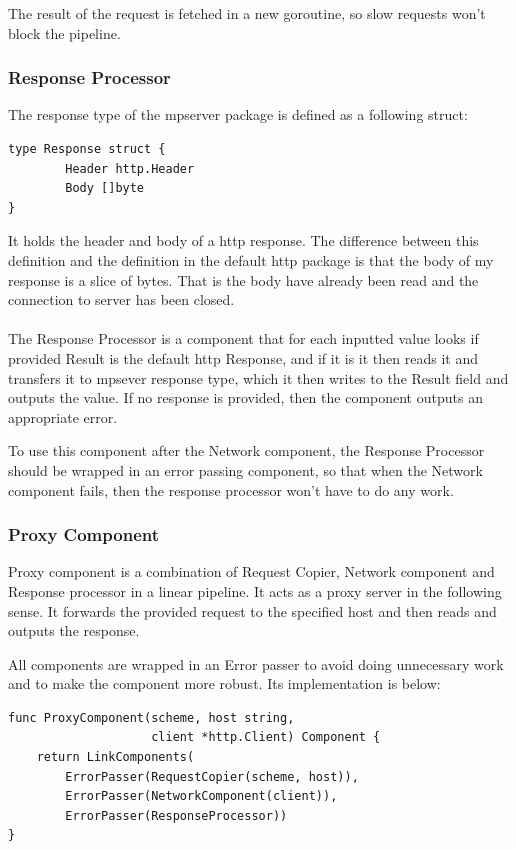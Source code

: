 \documentclass[12pt,a4paper]{article}
\begin{document}
The result of the request is fetched in a new goroutine, so slow requests
won't block the pipeline.

\subsubsection{Response Processor}
The response type of the mpserver package is defined as a following struct:
\begin{lstlisting}
type Response struct {
		Header http.Header
		Body []byte
}
\end{lstlisting}
It holds the header and body of a http response. The difference between
this definition and the definition in the default http package is that
the body of my response is a slice of bytes. That is the body have already been
read and the connection to server has been closed.
\\
\\
The Response Processor is a component that for each inputted value
looks if provided Result is the default http Response, and if it is
it then reads it and transfers it to mpsever response type, which it
then writes to the Result field and outputs the value. If no response
is provided, then the component outputs an appropriate error.

To use this component after the Network component, the Response Processor
should be wrapped in an error passing component, so that when the 
Network component fails, then the response processor won't have to do
any work.

\subsubsection{Proxy Component}
Proxy component is a combination of Request Copier, Network component 
and Response processor in a linear pipeline. It acts as a proxy server
in the following sense. It forwards the provided request to the specified
host and then reads and outputs the response. 

All components are wrapped
in an Error passer to avoid doing unnecessary work and to make the component
more robust. Its implementation is below:
\begin{lstlisting}
func ProxyComponent(scheme, host string, 
					client *http.Client) Component {
	return LinkComponents(
		ErrorPasser(RequestCopier(scheme, host)),
		ErrorPasser(NetworkComponent(client)),
		ErrorPasser(ResponseProcessor))
}
\end{lstlisting}
\end{document}
